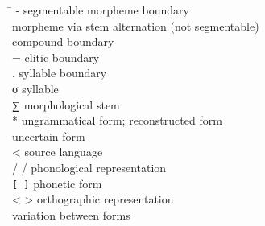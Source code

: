 %



\newcommand{\TABh}{\hspace{40pt}}%

\label{symbolList}
\begin{tabbing}
\TABh \= \kill
-		\> segmentable morpheme boundary \\
\BS		\> morpheme via stem alternation (not segmentable) \\
\PLUS	\> compound boundary \\%
=		\> clitic boundary \\
.		\> syllable boundary\\
σ		\> syllable \\
∑		\> morphological stem \\
*		\> ungrammatical form; reconstructed form \\%
\QUES	\> uncertain form \\
<		\> source language \\
/ /		\> phonological representation\\
\verb|[ ]|	\> phonetic form\\%
< >		\> orthographic representation\\
\TILDE	\> variation between forms \\
\end{tabbing}

